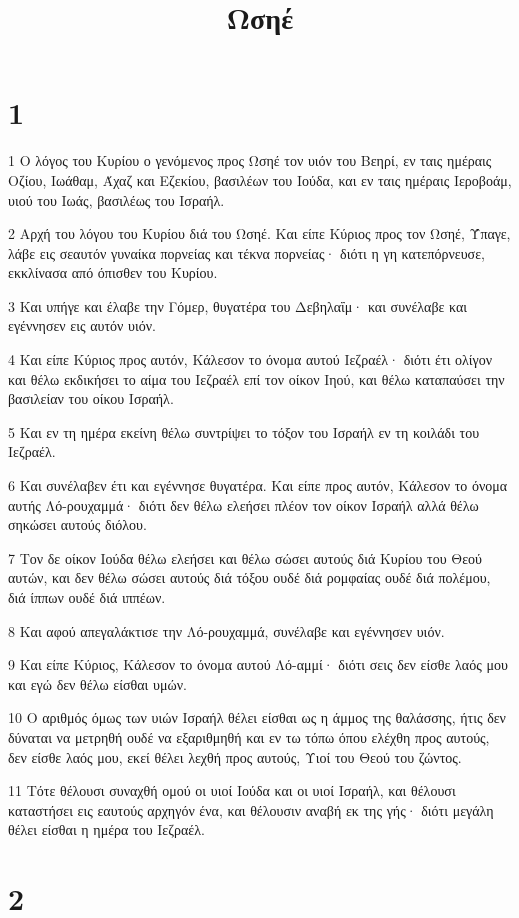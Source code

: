 

\title{Ωσηέ}


\chapter{1}

\par 1 Ο λόγος του Κυρίου ο γενόμενος προς Ωσηέ τον υιόν του Βεηρί, εν ταις ημέραις Οζίου, Ιωάθαμ, Άχαζ και Εζεκίου, βασιλέων του Ιούδα, και εν ταις ημέραις Ιεροβοάμ, υιού του Ιωάς, βασιλέως του Ισραήλ.
\par 2 Αρχή του λόγου του Κυρίου διά του Ωσηέ. Και είπε Κύριος προς τον Ωσηέ, Ύπαγε, λάβε εις σεαυτόν γυναίκα πορνείας και τέκνα πορνείας· διότι η γη κατεπόρνευσε, εκκλίνασα από όπισθεν του Κυρίου.
\par 3 Και υπήγε και έλαβε την Γόμερ, θυγατέρα του Δεβηλαΐμ· και συνέλαβε και εγέννησεν εις αυτόν υιόν.
\par 4 Και είπε Κύριος προς αυτόν, Κάλεσον το όνομα αυτού Ιεζραέλ· διότι έτι ολίγον και θέλω εκδικήσει το αίμα του Ιεζραέλ επί τον οίκον Ιηού, και θέλω καταπαύσει την βασιλείαν του οίκου Ισραήλ.
\par 5 Και εν τη ημέρα εκείνη θέλω συντρίψει το τόξον του Ισραήλ εν τη κοιλάδι του Ιεζραέλ.
\par 6 Και συνέλαβεν έτι και εγέννησε θυγατέρα. Και είπε προς αυτόν, Κάλεσον το όνομα αυτής Λό-ρουχαμμά· διότι δεν θέλω ελεήσει πλέον τον οίκον Ισραήλ αλλά θέλω σηκώσει αυτούς διόλου.
\par 7 Τον δε οίκον Ιούδα θέλω ελεήσει και θέλω σώσει αυτούς διά Κυρίου του Θεού αυτών, και δεν θέλω σώσει αυτούς διά τόξου ουδέ διά ρομφαίας ουδέ διά πολέμου, διά ίππων ουδέ διά ιππέων.
\par 8 Και αφού απεγαλάκτισε την Λό-ρουχαμμά, συνέλαβε και εγέννησεν υιόν.
\par 9 Και είπε Κύριος, Κάλεσον το όνομα αυτού Λό-αμμί· διότι σεις δεν είσθε λαός μου και εγώ δεν θέλω είσθαι υμών.
\par 10 Ο αριθμός όμως των υιών Ισραήλ θέλει είσθαι ως η άμμος της θαλάσσης, ήτις δεν δύναται να μετρηθή ουδέ να εξαριθμηθή και εν τω τόπω όπου ελέχθη προς αυτούς, δεν είσθε λαός μου, εκεί θέλει λεχθή προς αυτούς, Υιοί του Θεού του ζώντος.
\par 11 Τότε θέλουσι συναχθή ομού οι υιοί Ιούδα και οι υιοί Ισραήλ, και θέλουσι καταστήσει εις εαυτούς αρχηγόν ένα, και θέλουσιν αναβή εκ της γής· διότι μεγάλη θέλει είσθαι η ημέρα του Ιεζραέλ.

\chapter{2}


